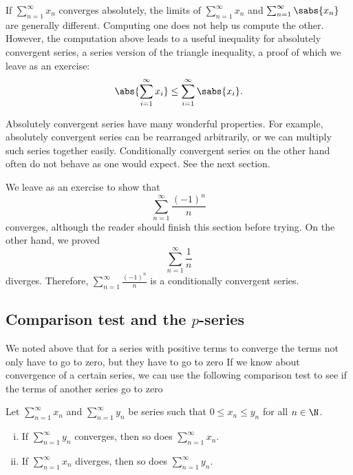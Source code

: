 If $\sum_{n=1}^\infty x_n$ converges absolutely, the limits of
$\sum_{n=1}^\infty x_n$ and $\sum_{n=1}^\infty \sabs{x_n}$ are generally different.  Computing one
does not help us compute the other.  However, the computation above leads to
a useful inequality for absolutely convergent series,
a series version of the triangle inequality,
a proof of which we leave as an exercise:
\begin{equation*}
\abs{ \sum_{i=1}^\infty x_i }
\leq
\sum_{i=1}^\infty \sabs{x_i} .
\end{equation*}

Absolutely convergent series have many wonderful properties.
For example, absolutely convergent
series can be rearranged arbitrarily, or we can multiply such
series together easily.  Conditionally convergent series on the other hand
often do not behave as one would expect.  See the next section.

We leave as an exercise to show that
\begin{equation*}
\sum_{n=1}^\infty \frac{{(-1)}^n}{n}
\end{equation*}
converges, although the reader should finish this section before trying.
On the other hand, we proved
\begin{equation*}
\sum_{n=1}^\infty \frac{1}{n}
\end{equation*}
diverges.  Therefore,
$\sum_{n=1}^\infty \frac{{(-1)}^n}{n}$ is a conditionally convergent series.

\subsection{Comparison test and the \texorpdfstring{$p$}{p}-series}

We noted above that for a series with positive terms to converge
the terms not only have to go to zero, but they have to go to zero
  If we know about convergence of a certain series,
we can use the following comparison test to see if the terms of another
series go to zero 

\begin{samepage}
\begin{prop}
Let $\sum_{n=1}^\infty x_n$ and $\sum_{n=1}^\infty y_n$ be series such that $0 \leq x_n \leq y_n$
for all $n \in \N$.
\begin{enumerate}[(i)]
\item If $\sum_{n=1}^\infty y_n$ converges, then so does $\sum_{n=1}^\infty x_n$.
\item If $\sum_{n=1}^\infty x_n$ diverges, then so does $\sum_{n=1}^\infty y_n$.
\end{enumerate}
\end{prop}
\end{samepage}

